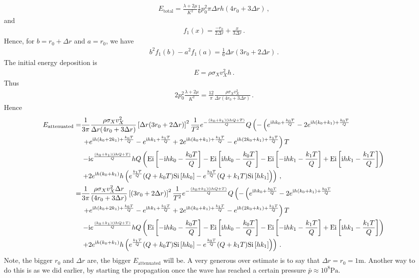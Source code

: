 \documentclass{article}
\newcommand*\te[1]{\text{#1}}
\newcommand*\p[1]{\left(#1\right)}
\newcommand*\ps[1]{\left[#1\right]}
\newcommand*\f[2]{\frac{#1}{#2}}
\newcommand*\I{\te{i}}
\begin{document}
\begin{align}
E_{\te{total}}=\f{\lambda+2\mu}{K^2}\f16 p_0^2 \pi\Delta r h(4 r_0+3\Delta r)\,,
\end{align}
and
\begin{align}
f_1(x)=\f{-r_0}{2\Delta r}+\f{x}{3\Delta r}\,.
\end{align}
Hence, for $b = r_0+\Delta r$ and $a = r_0$, we have
\begin{align}
b^2 f_1(b)-a^2f_1(a) = \f16\Delta r(3r_0+2\Delta r)\,.
\end{align}
The initial energy deposition is
\begin{align}
E = \rho\sigma_Xv_X^2h\,.
\end{align}
Thus
\begin{align}
2p_0^2\f{\lambda+2\mu}{K^2} =  \f{12}{\pi}\f{\rho\sigma_Xv_X^2}{\Delta r (4r_0+3\Delta r)}\,.
\end{align}
Hence
\begin{align}
\notag E_{\te{attenuated}} =&\f{1}{3\pi}\f{\rho\sigma_Xv_X^2}{\Delta r (4r_0+3\Delta r)}\ps{ \Delta r(3r_0+2\Delta r)}^2 \f{1}{T^2}e^{-\f{(k_0+k_1)(\I h Q+T)}{Q}} Q\p{-\p{e^{\I h k_0+\f{k_0T}{Q}} \notag -2e^{\I h(k_0+k_1)+\f{k_0 T}{Q}} \right.\right.\\&\left.\left.+ e^{\I h(k_0 + 2k_1) + \f{k_0 T}{Q}} - e^{\I h k_1 \notag + \f{k_1 T}{Q}} + 2 e^{\I h(k_0 + k_1) + \f{k_1 T}{Q}} - e^{\I h(2k_0 + k_1)+\f{k_1 T}{Q}}}T \right.\\&\left.- \I \notag e^{\f{(k_0+k_1)(\I h Q + T)}{Q}}h Q\p{\te{Ei}\ps{-\I h k_0 - \f{k_0 T}{Q}} - \te{Ei}\ps{\I h k_0 - \f{k_0 T}{Q}} - \te{Ei}\ps{-\I h k_1 - \f{k_1 T}{Q}} + \te{Ei}\ps{\I h k_1 - \f{k_1 T}{Q}}   } \right.\\&\left.+ 2e^{\I h(k_0+k_1)} h \p{e^{\f{k_1 T}{Q}}(Q + k_0 T)\te{Si}\ps{h k_0} - e^{\f{k_0 T}{Q}}(Q + k_1 T)\te{Si}\ps{h k_1}}}\,,\\
=&\f{1}{3\pi}\f{\rho\sigma_Xv_X^2\Delta r}{(4r_0+3\Delta r)}\ps{(3r_0+2\Delta r)}^2 \f{1}{T^2}e^{-\f{(k_0+k_1)(\I h Q+T)}{Q}} Q\p{-\p{e^{\I h k_0+\f{k_0T}{Q}} \notag -2e^{\I h(k_0+k_1)+\f{k_0 T}{Q}} \right.\right.\\&\left.\left.+ e^{\I h(k_0 + 2k_1) + \f{k_0 T}{Q}} - e^{\I h k_1 \notag + \f{k_1 T}{Q}} + 2 e^{\I h(k_0 + k_1) + \f{k_1 T}{Q}} - e^{\I h(2k_0 + k_1)+\f{k_1 T}{Q}}}T \right.\\&\left.- \I \notag e^{\f{(k_0+k_1)(\I h Q + T)}{Q}}h Q\p{\te{Ei}\ps{-\I h k_0 - \f{k_0 T}{Q}} - \te{Ei}\ps{\I h k_0 - \f{k_0 T}{Q}} - \te{Ei}\ps{-\I h k_1 - \f{k_1 T}{Q}} + \te{Ei}\ps{\I h k_1 - \f{k_1 T}{Q}}   } \right.\\&\left.+ 2e^{\I h(k_0+k_1)} h \p{e^{\f{k_1 T}{Q}}(Q + k_0 T)\te{Si}\ps{h k_0} - e^{\f{k_0 T}{Q}}(Q + k_1 T)\te{Si}\ps{h k_1}}}\,.
\end{align}
Note, the bigger $r_0$ and $\Delta r$ are, the bigger $E_{\te{attenuated}}$ will be. A very generous over estimate is to say that $\Delta r = r_0 = 1\te{m}$. Another way to do this is as we did earlier, by starting the propagation once the wave has reached a certain pressure $\bar p \approx 10^8\te{Pa}$.
\pagebreak
\end{document}
